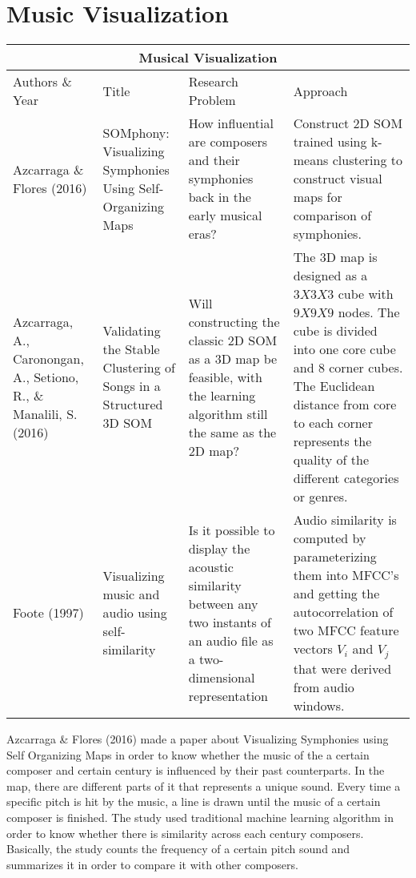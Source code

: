 \section{Music Visualization}

\begin{center}
\begin{tabular}{ |p{3cm}|p{3cm}|p{3cm}|p{3cm}| }
 \hline
 \multicolumn{4}{|c|}{Musical Visualization} \\
 \hline
 Authors \& Year&Title&Research Problem&Approach\\
 \hline
 Azcarraga \& Flores (2016)& SOMphony: Visualizing Symphonies Using Self-Organizing Maps & How influential are composers and their symphonies back in the early musical eras? & Construct 2D SOM trained using k-means clustering to construct visual maps for comparison of symphonies.\\
\hline
 Azcarraga, A., Caronongan, A., Setiono, R., \& Manalili, S. (2016) & Validating the Stable Clustering of Songs in a Structured 3D SOM & Will constructing the classic 2D SOM as a 3D map be feasible, with the learning algorithm still the same as the 2D map? & The 3D map is designed as a $3X3X3$ cube with $9X9X9$ nodes. The cube is divided into one core cube and 8 corner cubes. The Euclidean distance from core to each corner represents the quality of the different categories or genres. \\
\hline
 Foote (1997) & Visualizing music and audio using self-similarity & Is it possible to display the acoustic similarity between any two instants of an audio file as a two-dimensional representation & Audio similarity is computed by parameterizing them into MFCC’s and getting the autocorrelation of two MFCC feature vectors $V_i$ and $V_j$ that were derived from audio windows. \\
 \hline
\end{tabular}
\end{center}

Azcarraga \& Flores (2016) made a paper about Visualizing Symphonies using Self Organizing Maps in order to know whether the music of the a certain composer and certain century is influenced by their past counterparts. In the map, there are different parts of it that represents a unique sound. Every time a specific pitch is hit by the music, a line is drawn until the music of a certain composer is finished. The study used traditional machine learning algorithm in order to know whether there is similarity across each century composers. Basically, the study counts the frequency of a certain pitch sound and summarizes it in order to compare it with other composers.

